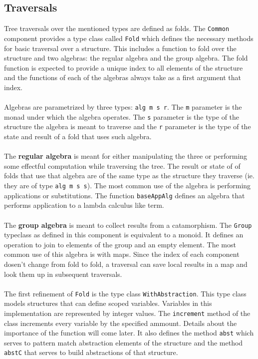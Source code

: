 \documentclass[8pt]{extarticle}
\begin{document}
\subsection{Traversals}
Tree traversals over the mentioned types are defined as folds. The \verb+Common+ component provides a type class called \verb+Fold+ which defines the necessary methods for basic traversal over a structure. This includes a function to fold over the structure and two algebras: the regular algebra and the group algebra. The fold function is expected to provide a unique index to all elements of the structure and the functions of each of the algebras always take as a first argument that index.
\\\\
Algebras are parametrized by three types: \verb+alg m s r+. The \verb+m+ parameter is the monad under which the algebra operates. The \verb+s+ parameter is the type of the structure the algebra is meant to traverse and the \verb+r+ parameter is the type of the state and result of a fold that uses such algebra.
\\\\
The {\bf regular algebra} is meant for either manipulating the three or performing some effectful computation while traversing the tree. The result or state of of folds that use that algebra are of the same type as the structure they traverse (ie. they are of type \verb+alg m s s+). The most common use of the algebra is performing applications or substitutions. The function \verb+baseAppAlg+ defines an algebra that performs application to a lambda calculus like term.
\\\\
The {\bf group algebra} is meant to collect results from a catamorphism. The \verb+Group+ typeclass as defined in this component is equivalent to a monoid. It defines an operation to join to elements of the group and an empty element. The most common use of this algebra is with maps. Since the index of each component dosen't change from fold to fold, a traversal can save local results in a map and look them up in subsequent traversals.
\\\\
The first refinement of \verb+Fold+ is the type class \verb+WithAbstraction+. This type class models structures that can define scoped variables. Variables in this implementation are represented by integer values. The \verb+increment+ method of the class increments every variable by the specified ammount. Details about the importance of the function will come later. It also defines the method \verb+abst+ which serves to pattern match abstraction elements of the structure and the method \verb+abstC+ that serves to build abstractions of that structure.
\end{document}
